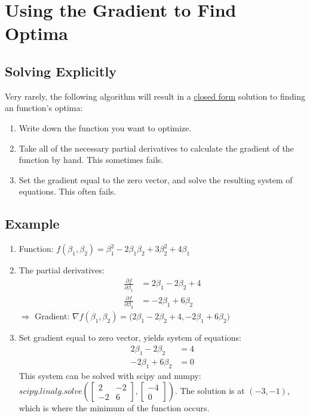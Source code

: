 \documentclass[a4paper, 12pt]{article}
\begin{document}
\section*{Using the Gradient to Find Optima}

\subsection*{Solving Explicitly}

Very rarely, the following algorithm will result in a \underline{closed form} solution to finding an function's optima:

\begin{enumerate}
  \item Write down the function you want to optimize.
  \item Take all of the necessary partial derivatives to calculate the gradient of the function by hand. This sometimes fails.
  \item Set the gradient equal to the zero vector, and solve the resulting system of equations. This often fails.
\end{enumerate}

\subsection*{Example}

\begin{enumerate}
  \item Function: $f(\beta_1, \beta_2) = \beta_1^2 -2\beta_1 \beta_2 + 3\beta_2^2 + 4 \beta_1$
  \item The partial derivatives:
    \begin{align*}
      \frac{\partial f}{\partial \beta_1} & = 2\beta_1 - 2\beta_2 + 4 \\
      \frac{\partial f}{\partial \beta_2} & = -2\beta_1 + 6\beta_2
    \end{align*}
    $\Rightarrow$ Gradient: $\nabla f(\beta_1, \beta_2) = \big( 2\beta_1 - 2\beta_2 + 4, -2\beta_1 +6\beta_2 \big)$
  \item Set gradient equal to zero vector, yields system of equations:
    \begin{align*}
      2\beta_1 - 2\beta_2 & = 4 \\
      -2\beta_1 + 6\beta_2 & = 0
    \end{align*}
    This system can be solved with scipy and numpy:
    $scipy.linalg.solve(\left[
        \begin{smallmatrix}
            2 & -2 \\
            -2 & 6
        \end{smallmatrix}
        \right], \left[
        \begin{smallmatrix}
            -4 \\
            0
        \end{smallmatrix}
        \right])$.
      \vspace{0.5pc}
      The solution is at $(-3, -1)$, which is where the minimum of the function occurs.
\end{enumerate}
\end{document}
